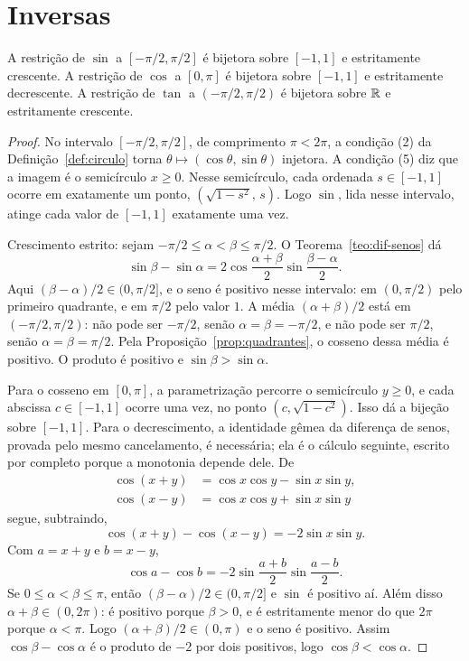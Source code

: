 \documentclass[11pt,a4paper]{article}
\begin{document}
\section{Inversas}

\begin{teorema}\label{teo:restricoes}
A restrição de $\sin$ a $[-\pi/2,\pi/2]$ é bijetora sobre $[-1,1]$ e estritamente crescente. A restrição de $\cos$ a $[0,\pi]$ é bijetora sobre $[-1,1]$ e estritamente decrescente. A restrição de $\tan$ a $(-\pi/2,\pi/2)$ é bijetora sobre $\mathbb{R}$ e estritamente crescente.
\end{teorema}

\begin{proof}
No intervalo $[-\pi/2,\pi/2]$, de comprimento $\pi<2\pi$, a condição (2) da Definição~\ref{def:circulo} torna $\theta\mapsto(\cos\theta,\sin\theta)$ injetora. A condição (5) diz que a imagem é o semicírculo $x\ge 0$. Nesse semicírculo, cada ordenada $s\in[-1,1]$ ocorre em exatamente um ponto, $( \sqrt{1-s^2},\, s)$. Logo $\sin$, lida nesse intervalo, atinge cada valor de $[-1,1]$ exatamente uma vez.

Crescimento estrito: sejam $-\pi/2\le \alpha<\beta\le\pi/2$. O Teorema~\ref{teo:dif-senos} dá
\[
\sin\beta-\sin\alpha=2\cos\frac{\alpha+\beta}{2}\sin\frac{\beta-\alpha}{2}.
\]
Aqui $(\beta-\alpha)/2\in(0,\pi/2]$, e o seno é positivo nesse intervalo: em $(0,\pi/2)$ pelo primeiro quadrante, e em $\pi/2$ pelo valor $1$. A média $(\alpha+\beta)/2$ está em $(-\pi/2,\pi/2)$: não pode ser $-\pi/2$, senão $\alpha=\beta=-\pi/2$, e não pode ser $\pi/2$, senão $\alpha=\beta=\pi/2$. Pela Proposição~\ref{prop:quadrantes}, o cosseno dessa média é positivo. O produto é positivo e $\sin\beta>\sin\alpha$.

Para o cosseno em $[0,\pi]$, a parametrização percorre o semicírculo $y\ge 0$, e cada abscissa $c\in[-1,1]$ ocorre uma vez, no ponto $(c,\sqrt{1-c^2})$. Isso dá a bijeção sobre $[-1,1]$. Para o decrescimento, a identidade gêmea da diferença de senos, provada pelo mesmo cancelamento, é necessária; ela é o cálculo seguinte, escrito por completo porque a monotonia depende dele. De
\begin{align*}
\cos(x+y)&=\cos x\cos y-\sin x\sin y,\\
\cos(x-y)&=\cos x\cos y+\sin x\sin y
\end{align*}
segue, subtraindo,
\[
\cos(x+y)-\cos(x-y)=-2\sin x\sin y.
\]
Com $a=x+y$ e $b=x-y$, 
\[
\cos a-\cos b=-2\sin\frac{a+b}{2}\sin\frac{a-b}{2}.
\]
Se $0\le\alpha<\beta\le\pi$, então $(\beta-\alpha)/2\in(0,\pi/2]$ e $\sin$ é positivo aí. Além disso $\alpha+\beta\in(0,2\pi)$: é positivo porque $\beta>0$, e é estritamente menor do que $2\pi$ porque $\alpha<\pi$. Logo $(\alpha+\beta)/2\in(0,\pi)$ e o seno é positivo. Assim $\cos\beta-\cos\alpha$ é o produto de $-2$ por dois positivos, logo $\cos\beta<\cos\alpha$.


\end{proof}
\end{document}

